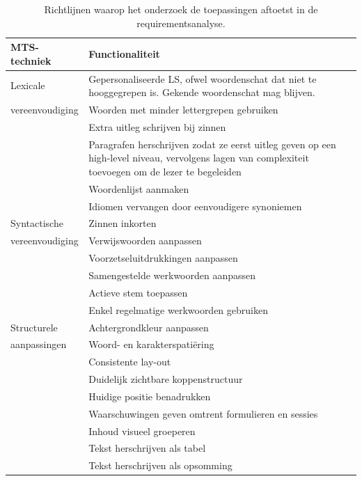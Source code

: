 \begin{center}
	\begin{table}[H]
		\begin{tabular}{ | m{4cm} | m{11cm} | } 
			\hline
			\textbf{MTS-techniek} & \textbf{Functionaliteit} \\
			\hline
			Lexicale & Gepersonaliseerde LS, ofwel woordenschat dat niet te hooggegrepen is. Gekende woordenschat mag blijven. \\
			vereenvoudiging & Woorden met minder lettergrepen gebruiken \\
			& Extra uitleg schrijven bij zinnen \\
			& Paragrafen herschrijven zodat ze eerst uitleg geven op een high-level niveau, vervolgens lagen van complexiteit toevoegen om de lezer te begeleiden \\
			& Woordenlijst aanmaken \\
			& Idiomen vervangen door eenvoudigere synoniemen \\
			\hline
			Syntactische & Zinnen inkorten \\
			vereenvoudiging & Verwijswoorden aanpassen \\
			& Voorzetseluitdrukkingen aanpassen \\
			& Samengestelde werkwoorden aanpassen \\
			& Actieve stem toepassen \\
			& Enkel regelmatige werkwoorden gebruiken \\
			\hline
			Structurele & Achtergrondkleur aanpassen \\
			aanpassingen & Woord- en karakterspatiëring \\
			& Consistente lay-out \\
			& Duidelijk zichtbare koppenstructuur \\
			& Huidige positie benadrukken \\
			& Waarschuwingen geven omtrent formulieren en sessies \\
			& Inhoud visueel groeperen \\
			& Tekst herschrijven als tabel \\
			& Tekst herschrijven als opsomming \\
			\hline
		\end{tabular}
		\caption{Richtlijnen waarop het onderzoek de toepassingen aftoetst in de requirementsanalyse.}
		\label{table:criteria-requirementsanalysis}	
	\end{table}
\end{center}

